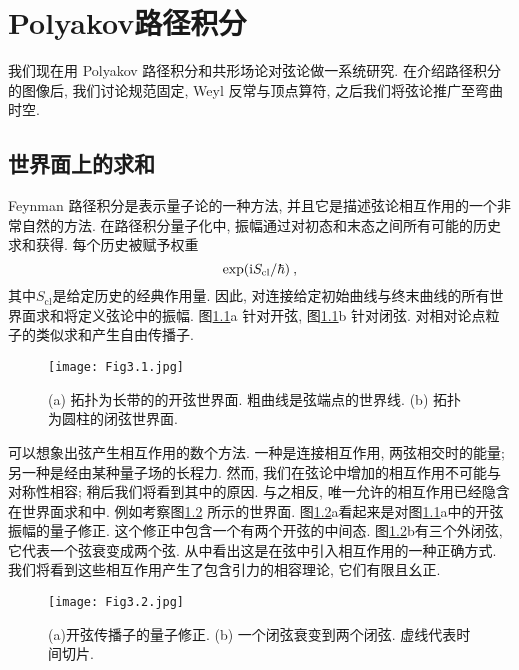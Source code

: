 
\chapter{\texorpdfstring{Polyakov路径积分}{3 The Polyakov path integral}} \label{cha:3}

我们现在用 Polyakov 路径积分和共形场论对弦论做一系统研究. 在介绍路径积分的图像后, 我们讨论规范固定, Weyl 反常与顶点算符, 
之后我们将弦论推广至弯曲时空.

\section{\texorpdfstring{世界面上的求和}{3.1 Sums over world-sheets}} \label{sec:3.1}
Feynman 路径积分是表示量子论的一种方法, 并且它是描述弦论相互作用的一个非常自然的方法. 在路径积分量子化中, 振幅通过对初态和末态之间所有可能的历史求和获得. 每个历史被赋予权重
\begin{equation}
	\exp (\mathrm{i} S_{\mathrm{cl}} / \hbar) \:, \label{3.1.1}
\end{equation}
其中$S_{\mathrm{cl}}$是给定历史的经典作用量. 因此, 对连接给定初始曲线与终末曲线的所有世界面求和将定义弦论中的振幅. 图\ref{Fig3.1}a 针对开弦, 图\ref{Fig3.1}b 针对闭弦. 对相对论点粒子的类似求和产生自由传播子.
\vspace{-0.5cm}
\begin{figure}[h]
	\begin{center}
		\texttt{[image: Fig3.1.jpg]}
\caption{(a) 拓扑为长带的的开弦世界面. 粗曲线是弦端点的世界线. (b) 拓扑为圆柱的闭弦世界面.}\label{Fig3.1}
	\end{center}
\end{figure}

可以想象出弦产生相互作用的数个方法. 一种是连接相互作用, 两弦相交时的能量; 另一种是经由某种量子场的长程力. 然而, 我们在弦论中增加的相互作用不可能与对称性相容; 稍后我们将看到其中的原因. 与之相反, 唯一允许的相互作用已经隐含在世界面求和中. 例如考察图\ref{Fig3.2} 所示的世界面. 图\ref{Fig3.2}a看起来是对图\ref{Fig3.1}a中的开弦振幅的量子修正. 这个修正中包含一个有两个开弦的中间态. 图\ref{Fig3.2}b有三个外闭弦, 它代表一个弦衰变成两个弦. 从中看出这是在弦中引入相互作用的一种正确方式. 我们将看到这些相互作用产生了包含引力的相容理论, 它们有限且幺正.
\begin{figure}[h]
	\begin{center}
		\texttt{[image: Fig3.2.jpg]}\\
\caption{(a)开弦传播子的量子修正. (b) 一个闭弦衰变到两个闭弦. 虚线代表时间切片.}\label{Fig3.2}
	\end{center}
\end{figure}

